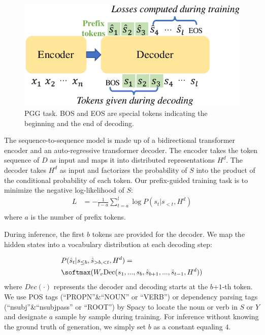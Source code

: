 \begin{figure}
	\centering
	\includegraphics[width=0.9\columnwidth]{pgg.pdf}
	\caption{PGG task. BOS and EOS are special tokens indicating the beginning and the end of decoding.}
	\label{fig:pgg}
\end{figure}

The sequence-to-sequence model is made up of a bidirectional transformer encoder and an auto-regressive transformer decoder. The encoder takes the token sequence of $D$ as input and maps it into distributed representations $H^d$. The decoder takes $H^d$ as input and factorizes the probability of $S$ into the product of the conditional probability of each token. 
Our prefix-guided training task is to minimize the negative log-likelihood of $S$:
\begin{equation}
	\begin{aligned}
		L &= -\frac{1}{l-a}\sum_{t=a}^{l}\log P(s_t|s_{<t},H^d) \\
	\end{aligned}
\end{equation}
where $a$ is the number of prefix tokens.

During inference, the first $b$ tokens are provided for the decoder. 
We map the hidden states into a vocabulary distribution at each decoding step:

\begin{align}
		&P(\hat{s}_t|s_{\leq b}, \hat{s}_{>b,<t},H^d) =\\
		& \softmax(W_v{\rm Dec}(s_1,..., s_b,\hat{s}_{b+1},...,\hat{s}_{t-1}, H^d))\notag
\end{align}
where $Dec(\cdot)$ represents the decoder and decoding starts at the $b$+$1$-th token. We use POS tags (``PROPN''\&``NOUN'' or ``VERB'') or dependency parsing tags (``nsubj''\&``nsubjpass'' or ``ROOT'') by Spacy to locate the noun or verb in $S$ or $Y$ and designate $a$ sample by sample during training. For inference without knowing the ground truth of generation, we simply set $b$ as a constant equaling $4$.

